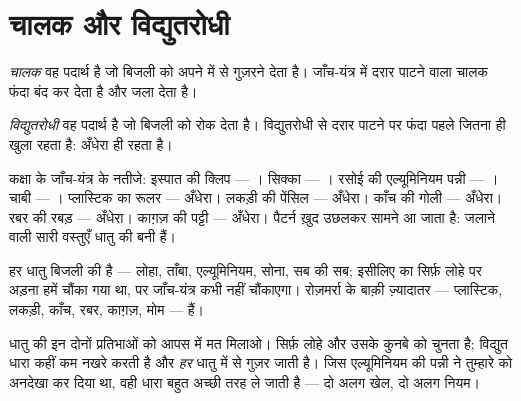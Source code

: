 \section{चालक और विद्युतरोधी}

\begin{definition}[चालक]\label{def:g4:conductors-insulators:conductor}
\emph{चालक} वह पदार्थ है जो बिजली को अपने में से गुज़रने
देता है। जाँच-यंत्र में दरार पाटने वाला चालक फंदा बंद कर देता है और
 जला देता है।
\end{definition}

\begin{definition}[विद्युतरोधी]\label{def:g4:conductors-insulators:insulator}
\emph{विद्युतरोधी} वह पदार्थ है जो बिजली को रोक
देता है। विद्युतरोधी से दरार पाटने पर फंदा पहले जितना ही खुला रहता है:
 अँधेरा ही रहता है।
\end{definition}

\begin{example}[जाँचों से भरी एक सुबह]\label{ex:g4:conductors-insulators:trials}
कक्षा के जाँच-यंत्र के नतीजे: इस्पात की क्लिप --- । सिक्का ---
। रसोई की एल्यूमिनियम पन्नी --- । चाबी --- ।
प्लास्टिक का रूलर --- अँधेरा। लकड़ी की पेंसिल --- अँधेरा। काँच की
गोली --- अँधेरा। रबर की रबड़ --- अँधेरा। काग़ज़ की पट्टी --- अँधेरा।
पैटर्न ख़ुद उछलकर सामने आ जाता है:  जलाने वाली सारी वस्तुएँ धातु
की बनी हैं।
\end{example}

\begin{proposition}[धातुएँ चालक होती हैं]\label{prop:g4:conductors-insulators:metals}
हर धातु बिजली की  है --- लोहा, ताँबा, एल्यूमिनियम, सोना, सब की
सब; इसीलिए  का सिर्फ़ लोहे पर अड़ना हमें चौंका गया था, पर
जाँच-यंत्र कभी नहीं चौंकाएगा। रोज़मर्रा के बाक़ी ज़्यादातर  ---
प्लास्टिक, लकड़ी, काँच, रबर, काग़ज़, मोम ---  हैं।
\end{proposition}

\begin{remark}[चालक होना चुंबकीय होना नहीं है]\label{rem:g4:conductors-insulators:notmagnet}
धातु की इन दोनों प्रतिभाओं को आपस में मत मिलाओ।  सिर्फ़ लोहे और
उसके कुनबे को चुनता है; विद्युत धारा कहीं कम नखरे करती है और
\emph{हर} धातु में से गुज़र जाती है। जिस एल्यूमिनियम की पन्नी ने
तुम्हारे  को अनदेखा कर दिया था, वही धारा बहुत अच्छी तरह ले जाती
है --- दो अलग खेल, दो अलग नियम।
\end{remark}

